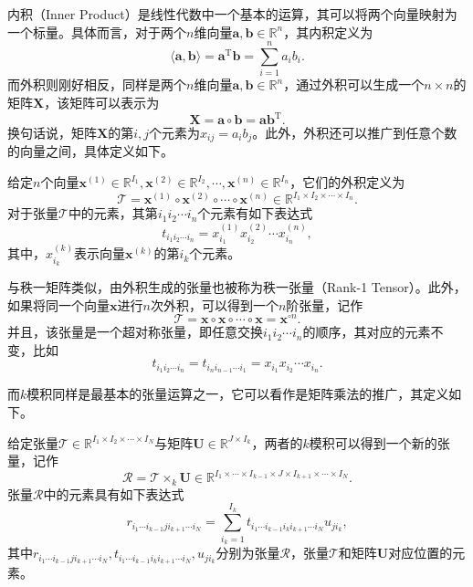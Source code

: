内积（Inner Product）是线性代数中一个基本的运算，其可以将两个向量映射为一个标量。具体而言，对于两个\( n \)维向量\( \bm{a}, \bm{b} \in \mathbb{R}^{n} \)，其内积定义为
\[
    \langle \bm{a}, \bm{b} \rangle = \bm{a}^{\mathrm{T}} \bm{b} = \sum_{i=1}^n a_i b_i.
\]
而外积则刚好相反，同样是两个\( n \)维向量\( \bm{a}, \bm{b} \in \mathbb{R}^{n} \)，通过外积可以生成一个\( n \times n \)的矩阵\( \mathbf{X} \)，该矩阵可以表示为
\[
    \mathbf{X} = \bm{a} \circ \bm{b} = \bm{a} \bm{b}^{\mathrm{T}}.
\]
换句话说，矩阵\( \mathbf{X} \)的第\( i,j \)个元素为\( x_{ij} = a_i b_j \)。此外，外积还可以推广到任意个数的向量之间，具体定义如下。
\begin{definition}\label{def:outer-product}
    给定\( n \)个向量\( \bm{x}^{(1)} \in \mathbb{R}^{I_1}, \bm{x}^{(2)} \in \mathbb{R}^{I_2}, \cdots, \bm{x}^{(n)} \in \mathbb{R}^{I_n} \)，它们的外积定义为
    \[
        \mathcal{T} = \bm{x}^{(1)} \circ \bm{x}^{(2)} \circ \cdots \circ \bm{x}^{(n)} \in \mathbb{R}^{I_1 \times I_2 \times \cdots \times I_n}.
    \]
    对于张量\( \mathcal{T} \)中的元素，其第\( i_1 i_2 \cdots i_n \)个元素有如下表达式
    \[
        t_{i_1 i_2 \cdots i_n} = x^{(1)}_{i_1} x^{(2)}_{i_2} \cdots x^{(n)}_{i_n},
    \]
    其中，\( x^{(k)}_{i_k} \)表示向量\( \bm{x}^{(k)} \)的第\( i_k \)个元素。
\end{definition}

与秩一矩阵类似，由外积生成的张量也被称为秩一张量（Rank-1 Tensor）。此外，如果将同一个向量\( \bm{x} \)进行\( n \)次外积，可以得到一个\( n \)阶张量，记作
\[
    \mathcal{T} = \bm{x} \circ \bm{x} \circ \cdots \circ \bm{x} = \bm{x}^{\circ n}.
\]
并且，该张量是一个超对称张量，即任意交换\( i_1 i_2 \cdots i_n \)的顺序，其对应的元素不变，比如
\[
    t_{i_1 i_2 \cdots i_n} = t_{i_n i_{n-1} \cdots i_1} = x_{i_1} x_{i_2} \cdots x_{i_n}.
\]

而$k$模积同样是最基本的张量运算之一，它可以看作是矩阵乘法的推广，其定义如下。
\begin{definition}%
    给定张量$\mathcal T \in \mathbb {R}^{I_1 \times I_2 \times \cdots \times I_N }$与矩阵$\mathbf U \in \mathbb {R}^{J \times I_k}$，两者的$k$模积可以得到一个新的张量，记作
    \begin{equation}
        \mathcal{R} = \mathcal T \times_{k} \mathbf U \in \mathbb {R}^{I_1 \times \cdots \times I_{k-1} \times J \times I_{k+1}\times \cdots \times I_N }.
    \end{equation}
    张量\( \mathcal{R} \)中的元素具有如下表达式
    \begin{equation}
        r_{i_1\cdots i_{k-1}ji_{k+1}\cdots i_N}=\sum_{i_{k}=1} ^{I_{k}} t_{i_1 \cdots i_{k-1}i_ki_{k+1} \cdots i_N} u_{ji_{k}},
    \end{equation}
    其中\( r_{i_1\cdots i_{k-1}ji_{k+1}\cdots i_N}, t_{i_1 \cdots i_{k-1}i_ki_{k+1} \cdots i_N}, u_{ji_{k}} \)分别为张量\( \mathcal{R} \)，张量\( \mathcal T \)和矩阵\( \mathbf{U} \)对应位置的元素。
\end{definition}

